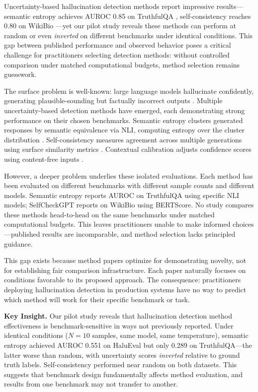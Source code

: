 Uncertainty-based hallucination detection methods report impressive results---semantic entropy achieves AUROC 0.85 on TruthfulQA \citep{kuhn2023semantic}, self-consistency reaches 0.80 on WikiBio \citep{manakul2023selfcheckgpt}---yet our pilot study reveals these methods can perform at random or even \emph{inverted} on different benchmarks under identical conditions. This gap between published performance and observed behavior poses a critical challenge for practitioners selecting detection methods: without controlled comparison under matched computational budgets, method selection remains guesswork.

The surface problem is well-known: large language models hallucinate confidently, generating plausible-sounding but factually incorrect outputs \citep{lin2022truthfulqa}. Multiple uncertainty-based detection methods have emerged, each demonstrating strong performance on their chosen benchmarks. Semantic entropy clusters generated responses by semantic equivalence via NLI, computing entropy over the cluster distribution \citep{kuhn2023semantic}. Self-consistency measures agreement across multiple generations using surface similarity metrics \citep{manakul2023selfcheckgpt}. Contextual calibration adjusts confidence scores using content-free inputs \citep{zhao2021calibrate}.

However, a deeper problem underlies these isolated evaluations. Each method has been evaluated on different benchmarks with different sample counts and different models. Semantic entropy reports AUROC on TruthfulQA using specific NLI models; SelfCheckGPT reports on WikiBio using BERTScore. No study compares these methods head-to-head on the same benchmarks under matched computational budgets. This leaves practitioners unable to make informed choices---published results are incomparable, and method selection lacks principled guidance.

This gap exists because method papers optimize for demonstrating novelty, not for establishing fair comparison infrastructure. Each paper naturally focuses on conditions favorable to its proposed approach. The consequence: practitioners deploying hallucination detection in production systems have no way to predict which method will work for their specific benchmark or task.

\textbf{Key Insight.} Our pilot study reveals that hallucination detection method effectiveness is benchmark-sensitive in ways not previously reported. Under identical conditions ($N=10$ samples, same model, same temperature), semantic entropy achieved AUROC 0.551 on HaluEval but only 0.289 on TruthfulQA---the latter worse than random, with uncertainty scores \emph{inverted} relative to ground truth labels. Self-consistency performed near random on both datasets. This suggests that benchmark design fundamentally affects method evaluation, and results from one benchmark may not transfer to another.

